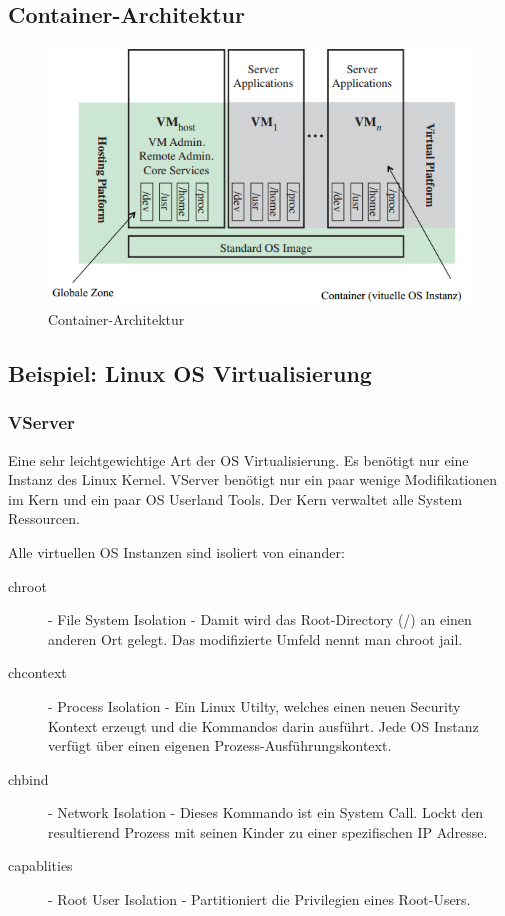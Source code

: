 \subsection{Container-Architektur}
\begin{figure}[h!]
\centering
\includegraphics[width=0.7\linewidth]{fig/container-architektur}
\caption{Container-Architektur}
\label{fig:container-architektur}
\end{figure}

\subsection{Beispiel: Linux OS Virtualisierung}
\subsubsection{VServer}
Eine sehr leichtgewichtige Art der OS Virtualisierung. Es benötigt nur eine Instanz des Linux Kernel. VServer benötigt nur ein paar wenige Modifikationen im Kern und ein paar OS Userland Tools. Der Kern verwaltet alle System Ressourcen.

Alle virtuellen OS Instanzen sind isoliert von einander:
\begin{description}
	\item[chroot] - File System Isolation - Damit wird das Root-Directory (/) an einen anderen Ort gelegt. Das modifizierte Umfeld nennt man chroot jail.
	\item[chcontext] - Process Isolation - Ein Linux Utilty, welches einen neuen Security Kontext erzeugt und die Kommandos darin ausführt. Jede OS Instanz verfügt über einen eigenen Prozess-Ausführungskontext.
	\item[chbind] - Network Isolation - Dieses Kommando ist ein System Call. Lockt den resultierend Prozess mit seinen Kinder zu einer spezifischen IP Adresse.
	\item[capablities] - Root User Isolation - Partitioniert die Privilegien eines Root-Users. 
\end{description}

